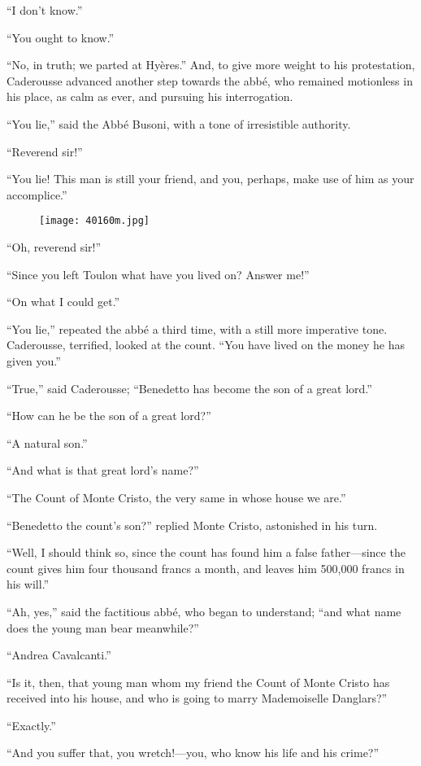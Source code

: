 “I don’t know.”

“You ought to know.”

“No, in truth; we parted at Hyères.” And, to give more weight to his
protestation, Caderousse advanced another step towards the abbé, who
remained motionless in his place, as calm as ever, and pursuing his
interrogation.

“You lie,” said the Abbé Busoni, with a tone of irresistible authority.

“Reverend sir!”

“You lie! This man is still your friend, and you, perhaps, make use of
him as your accomplice.”

\begin{figure}[ht]
\texttt{[image: 40160m.jpg]}
\end{figure}

“Oh, reverend sir!”

“Since you left Toulon what have you lived on? Answer me!”

“On what I could get.”

“You lie,” repeated the abbé a third time, with a still more imperative
tone. Caderousse, terrified, looked at the count. “You have lived on
the money he has given you.”

“True,” said Caderousse; “Benedetto has become the son of a great
lord.”

“How can he be the son of a great lord?”

“A natural son.”

“And what is that great lord’s name?”

“The Count of Monte Cristo, the very same in whose house we are.”

“Benedetto the count’s son?” replied Monte Cristo, astonished in his
turn.

“Well, I should think so, since the count has found him a false
father—since the count gives him four thousand francs a month, and
leaves him 500,000 francs in his will.”

“Ah, yes,” said the factitious abbé, who began to understand; “and what
name does the young man bear meanwhile?”

“Andrea Cavalcanti.”

“Is it, then, that young man whom my friend the Count of Monte Cristo
has received into his house, and who is going to marry Mademoiselle
Danglars?”

“Exactly.”

“And you suffer that, you wretch!—you, who know his life and his
crime?”


